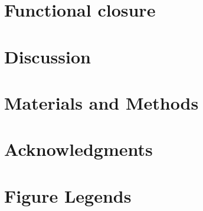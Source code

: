 \documentclass[10pt]{article}
\begin{document}
\section*{Functional closure}


\section*{Discussion}

\section*{Materials and Methods}
%
%
%
%
%
%
%
%

\section*{Acknowledgments}





\section*{Figure Legends}
\end{document}
